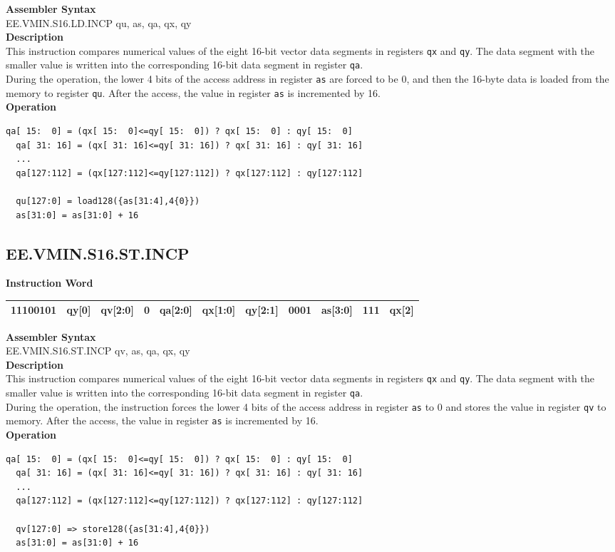 \textbf{Assembler Syntax} \\
EE.VMIN.S16.LD.INCP qu, as, qa, qx, qy \\
\textbf{Description} \\
This instruction compares numerical values of the eight 16-bit vector data segments in registers \lstinline{qx} and \lstinline{qy}. The data segment with the smaller value is written into the corresponding 16-bit data segment in register \lstinline{qa}.\\
During the operation, the lower 4 bits of the access address in register \lstinline{as} are forced to be 0, and then the 16-byte data is loaded from the memory to register \lstinline{qu}. After the access, the value in register \lstinline{as} is incremented by 16.\\
\textbf{Operation}
\begin{lstlisting}[escapeinside=`?]
  qa[ 15:  0] = (qx[ 15:  0]<=qy[ 15:  0]) ? qx[ 15:  0] : qy[ 15:  0]
  qa[ 31: 16] = (qx[ 31: 16]<=qy[ 31: 16]) ? qx[ 31: 16] : qy[ 31: 16]
  ...
  qa[127:112] = (qx[127:112]<=qy[127:112]) ? qx[127:112] : qy[127:112]

  qu[127:0] = load128({as[31:4],4{0}})
  as[31:0] = as[31:0] + 16
\end{lstlisting}

\clearpage
\subsection{EE.VMIN.S16.ST.INCP}\label{instruction:EEVMINS16STINCP}
\setlength\tabcolsep{6pt}
\textbf{Instruction Word} \\
\begin{tabular}{|c|c|c|c|c|c|c|c|c|c|c|}
	\hline
	11100101 & qy[0] & qv[2:0] & 0 & qa[2:0] & qx[1:0] & qy[2:1] & 0001 & as[3:0] & 111 & qx[2] \\
	\hline
\end{tabular}

\textbf{Assembler Syntax} \\
EE.VMIN.S16.ST.INCP qv, as, qa, qx, qy \\
\textbf{Description} \\
This instruction compares numerical values of the eight 16-bit vector data segments in registers \lstinline{qx} and \lstinline{qy}. The data segment with the smaller value is written into the corresponding 16-bit data segment in register \lstinline{qa}.\\
During the operation, the instruction forces the lower 4 bits of the access address in register \lstinline{as} to 0 and stores the value in register \lstinline{qv} to memory. After the access, the value in register \lstinline{as} is incremented by 16.\\
\textbf{Operation}
\begin{lstlisting}[escapeinside=`?]
  qa[ 15:  0] = (qx[ 15:  0]<=qy[ 15:  0]) ? qx[ 15:  0] : qy[ 15:  0]
  qa[ 31: 16] = (qx[ 31: 16]<=qy[ 31: 16]) ? qx[ 31: 16] : qy[ 31: 16]
  ...
  qa[127:112] = (qx[127:112]<=qy[127:112]) ? qx[127:112] : qy[127:112]

  qv[127:0] => store128({as[31:4],4{0}})
  as[31:0] = as[31:0] + 16
\end{lstlisting}

